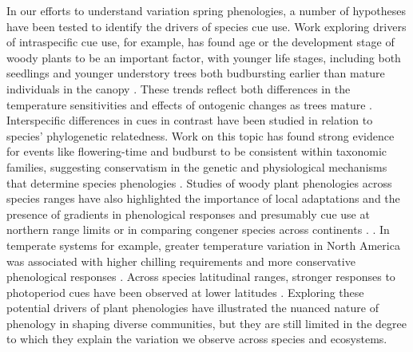 \documentclass{article}\usepackage[]{graphicx}\usepackage[]{color}
\begin{document}
In our efforts to understand variation spring phenologies, a number of hypotheses have been tested to identify the drivers of species cue use. Work exploring drivers of intraspecific cue use, for example, has found age or the development stage of woody plants to be an important factor, with younger life stages, including both seedlings and younger understory trees both budbursting earlier than mature individuals in the canopy \citep{Vitasse2013,Seiwa1991}. These trends reflect both differences in the temperature sensitivities and effects of ontogenic changes as trees mature \citep{Vitasse2013,Seiwa1991}. Interspecific differences in cues in contrast have been studied in relation to species' phylogenetic relatedness. Work on this topic has found strong evidence for events like flowering-time and budburst to be consistent within taxonomic families, suggesting conservatism in the genetic and physiological mechanisms that determine species phenologies \citep{Kochmer1986,Davies2013,Gougherty2018}. Studies of woody plant phenologies across species ranges have also highlighted the importance of local adaptations and the presence of gradients in phenological responses and presumably cue use at northern range limits or in comparing congener species across continents \citep{Lechowicz1984,Chuine2001,Chuine2010}. \cite{Zohner2017}. In temperate systems for example, greater temperature variation in North America was associated with higher chilling requirements and more conservative phenological responses \citep{Zohner2017}.  Across species latitudinal ranges, stronger responses to photoperiod cues have been observed at lower latitudes \citep{Zohner2016}. Exploring these potential drivers of plant phenologies have illustrated the nuanced nature of phenology in shaping diverse communities, but they are still limited in the degree to which they explain the variation we observe across species and ecosystems.
\end{document}
